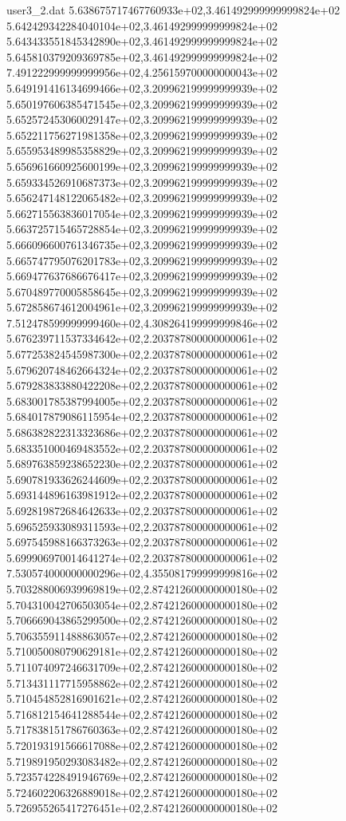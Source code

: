 \begin{filecontents}{user3_2.dat}
5.638675717467760933e+02,3.461492999999999824e+02
5.642429342284040104e+02,3.461492999999999824e+02
5.643433551845342890e+02,3.461492999999999824e+02
5.645810379209369785e+02,3.461492999999999824e+02
7.491222999999999956e+02,4.256159700000000043e+02
5.649191416134699466e+02,3.209962199999999939e+02
5.650197606385471545e+02,3.209962199999999939e+02
5.652572453060029147e+02,3.209962199999999939e+02
5.652211756271981358e+02,3.209962199999999939e+02
5.655953489985358829e+02,3.209962199999999939e+02
5.656961660925600199e+02,3.209962199999999939e+02
5.659334526910687373e+02,3.209962199999999939e+02
5.656247148122065482e+02,3.209962199999999939e+02
5.662715563836017054e+02,3.209962199999999939e+02
5.663725715465728854e+02,3.209962199999999939e+02
5.666096600761346735e+02,3.209962199999999939e+02
5.665747795076201783e+02,3.209962199999999939e+02
5.669477637686676417e+02,3.209962199999999939e+02
5.670489770005858645e+02,3.209962199999999939e+02
5.672858674612004961e+02,3.209962199999999939e+02
7.512478599999999460e+02,4.308264199999999846e+02
5.676239711537334642e+02,2.203787800000000061e+02
5.677253824545987300e+02,2.203787800000000061e+02
5.679620748462664324e+02,2.203787800000000061e+02
5.679283833880422208e+02,2.203787800000000061e+02
5.683001785387994005e+02,2.203787800000000061e+02
5.684017879086115954e+02,2.203787800000000061e+02
5.686382822313323686e+02,2.203787800000000061e+02
5.683351000469483552e+02,2.203787800000000061e+02
5.689763859238652230e+02,2.203787800000000061e+02
5.690781933626244609e+02,2.203787800000000061e+02
5.693144896163981912e+02,2.203787800000000061e+02
5.692819872684642633e+02,2.203787800000000061e+02
5.696525933089311593e+02,2.203787800000000061e+02
5.697545988166373263e+02,2.203787800000000061e+02
5.699906970014641274e+02,2.203787800000000061e+02
7.530574000000000296e+02,4.355081799999999816e+02
5.703288006939969819e+02,2.874212600000000180e+02
5.704310042706503054e+02,2.874212600000000180e+02
5.706669043865299500e+02,2.874212600000000180e+02
5.706355911488863057e+02,2.874212600000000180e+02
5.710050080790629181e+02,2.874212600000000180e+02
5.711074097246631709e+02,2.874212600000000180e+02
5.713431117715958862e+02,2.874212600000000180e+02
5.710454852816901621e+02,2.874212600000000180e+02
5.716812154641288544e+02,2.874212600000000180e+02
5.717838151786760363e+02,2.874212600000000180e+02
5.720193191566617088e+02,2.874212600000000180e+02
5.719891950293083482e+02,2.874212600000000180e+02
5.723574228491946769e+02,2.874212600000000180e+02
5.724602206326889018e+02,2.874212600000000180e+02
5.726955265417276451e+02,2.874212600000000180e+02

\end{filecontents}
